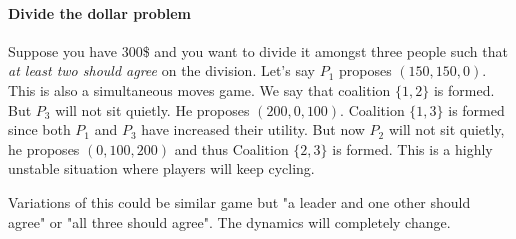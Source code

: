 \paragraph{Divide the dollar problem} Suppose you have 300\$ and you want to divide it amongst three people such that \textit{at least two should agree} on the division. Let's say $P_1$ proposes $(150, 150, 0)$. This is also a simultaneous moves game. We say that coalition $\{1,2\}$ is formed. But $P_3$ will not sit quietly. He proposes $(200, 0, 100)$. Coalition $\{ 1,3\}$ is formed since both $P_1$ and $P_3$ have increased their utility. But now $P_2$ will not sit quietly, he proposes $(0, 100, 200)$ and thus Coalition $\{2, 3\}$ is formed. This is a highly unstable situation where players will keep cycling.

Variations of this could be similar game but "a leader and one other should agree" or "all three should agree". The dynamics will completely change. 
